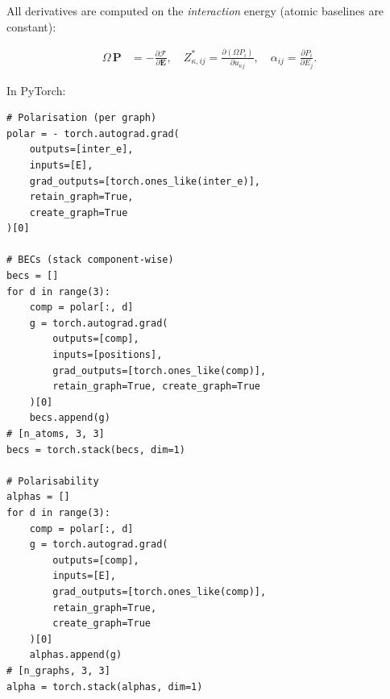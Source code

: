 \documentclass[aps,physrev,graphicx,amsmath,amssymb,reprint]{revtex4-2} %
\begin{document}
All derivatives are computed on the \emph{interaction} energy (atomic baselines are constant):

\begin{align}
\Omega\,\mathbf P &= -\frac{\partial \mathcal F}{\partial \mathbf E},
\quad
Z^*_{\kappa,ij} = \frac{\partial (\Omega P_i)}{\partial u_{\kappa j}},
\quad
\alpha_{ij} = \frac{\partial P_i}{\partial E_j}.
\end{align}

In PyTorch:
\begin{verbatim}
# Polarisation (per graph)
polar = - torch.autograd.grad(
    outputs=[inter_e], 
    inputs=[E], 
    grad_outputs=[torch.ones_like(inter_e)],
    retain_graph=True, 
    create_graph=True
)[0]

# BECs (stack component-wise)
becs = []
for d in range(3):
    comp = polar[:, d]
    g = torch.autograd.grad(
        outputs=[comp], 
        inputs=[positions],
        grad_outputs=[torch.ones_like(comp)],
        retain_graph=True, create_graph=True
    )[0]
    becs.append(g)
# [n_atoms, 3, 3]
becs = torch.stack(becs, dim=1)   

# Polarisability
alphas = []
for d in range(3):
    comp = polar[:, d]
    g = torch.autograd.grad(
        outputs=[comp], 
        inputs=[E],
        grad_outputs=[torch.ones_like(comp)],
        retain_graph=True, 
        create_graph=True
    )[0]
    alphas.append(g)
# [n_graphs, 3, 3]
alpha = torch.stack(alphas, dim=1)  
\end{verbatim}
\par{}
\end{document}
